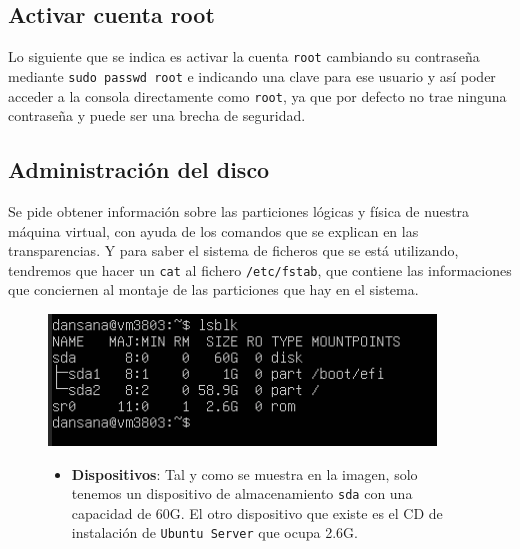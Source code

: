 \documentclass[10pt]{article}
\begin{document}
	\subsection{Activar cuenta root}
	Lo siguiente que se indica es activar la cuenta \verb|root| cambiando su contraseña mediante \verb|sudo passwd root| e indicando una clave para ese usuario y así poder acceder a la consola directamente como \verb|root|, ya que por defecto no trae ninguna contraseña y puede ser una brecha de seguridad.
	
	\subsection{Administración del disco}
	Se pide obtener información sobre las particiones lógicas y física de nuestra máquina virtual, con ayuda de los comandos que se explican en las transparencias. 
	Y para saber el sistema de ficheros que se está utilizando, tendremos que hacer un \verb|cat| al fichero \verb|/etc/fstab|, que contiene las informaciones que conciernen al montaje de las particiones que hay en el sistema.
	\begin{figure}[H]
		\centering
		\begin{minipage}{0.5\textwidth}
			\centering
			\includegraphics[width=\linewidth]{Recursos/particiones.png}
		\end{minipage}\hfill
		\begin{minipage}{0.45\textwidth}
			\begin{itemize}
				\item \textbf{Dispositivos}: Tal y como se muestra en la imagen, solo tenemos un dispositivo de almacenamiento \verb|sda| con una capacidad de 60G. El otro dispositivo que existe es el CD de instalación de \verb|Ubuntu Server| que ocupa 2.6G.
			\end{itemize}
		\end{minipage}
	\end{figure}
	
\end{document}
